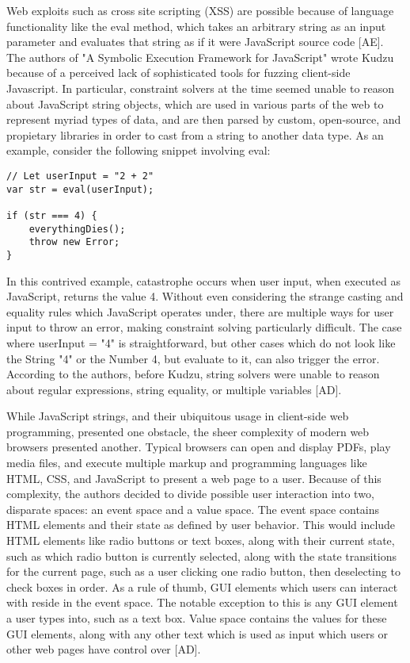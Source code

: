 \documentclass[11pt,expanded,copyright]{fsuthesis}
\begin{document}
Web exploits such as cross site scripting (XSS) are possible because of language functionality like the eval method, which takes an arbitrary string as an input parameter and evaluates that string as if it were JavaScript source code [AE]. The authors of "A Symbolic Execution Framework for JavaScript" wrote Kudzu because of a perceived lack of sophisticated tools for fuzzing client-side Javascript. In particular, constraint solvers at the time seemed unable to reason about JavaScript string objects, which are used in various parts of the web to represent myriad types of data, and are then parsed by custom, open-source, and propietary libraries in order to cast from a string to another data type. As an example, consider the following snippet involving eval:

\begin{lstlisting}[style=jsstyle]
// Let userInput = "2 + 2"
var str = eval(userInput); 

if (str === 4) {
	everythingDies();
	throw new Error;
}
\end{lstlisting}

In this contrived example, catastrophe occurs when user input, when executed as JavaScript, returns the value 4. Without even considering the strange casting and equality rules which JavaScript operates under, there are multiple ways for user input to throw an error, making constraint solving particularly difficult. The case where userInput = "4" is straightforward, but other cases which do not look like the String "4" or the Number 4, but evaluate to it, can also trigger the error. According to the authors, before Kudzu, string solvers were unable to reason about regular expressions, string equality, or multiple variables [AD].

While JavaScript strings, and their ubiquitous usage in client-side web programming, presented one obstacle, the sheer complexity of modern web browsers presented another. Typical browsers can open and display PDFs, play media files, and execute multiple markup and programming languages like HTML, CSS, and JavaScript to present a web page to a user. Because of this complexity, the authors decided to divide possible user interaction into two, disparate spaces: an event space and a value space. The event space contains HTML elements and their state as defined by user behavior. This would include HTML elements like radio buttons or text boxes, along with their current state, such as which radio button is currently selected, along with the state transitions for the current page, such as a user clicking one radio button, then deselecting to check boxes in order. As a rule of thumb, GUI elements which users can interact with reside in the event space. The notable exception to this is any GUI element a user types into, such as a text box. Value space contains the values for these GUI elements, along with any other text which is used as input which users or other web pages have control over [AD].
\end{document}
